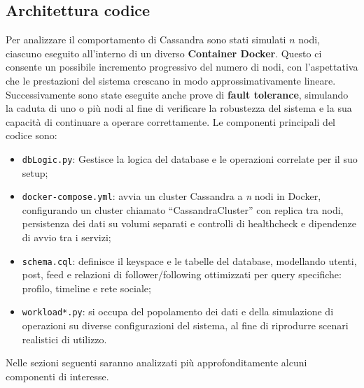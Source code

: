 \documentclass[12pt]{article}
\begin{document}
\subsection{Architettura codice} \label{s_architettura}
Per analizzare il comportamento di Cassandra sono stati simulati $n$ nodi, ciascuno eseguito all'interno di un diverso \textbf{Container Docker}. Questo ci consente un possibile incremento progressivo del numero di nodi, con l'aspettativa che le prestazioni del sistema crescano in modo approssimativamente lineare.
\newline\newline
Successivamente sono state eseguite anche prove di \textbf{fault tolerance}, simulando la caduta di uno o più nodi al fine di verificare la robustezza del sistema e la sua capacità di continuare a operare correttamente.
\newline\newline
Le componenti principali del codice sono:
\begin{itemize}
    \item \texttt{dbLogic.py}: Gestisce la logica del database e le operazioni correlate per il suo setup;
    \item \texttt{docker-compose.yml}: avvia un cluster Cassandra a \textit{n} nodi in Docker, configurando un cluster chiamato “CassandraCluster” con replica tra nodi, persistenza dei dati su volumi separati e controlli di healthcheck e dipendenze di avvio tra i servizi;
    \item \texttt{schema.cql}: definisce il keyspace e le tabelle del database, modellando utenti, post, feed e relazioni di follower/following ottimizzati per query specifiche: profilo, timeline e rete sociale;
    \item \texttt{workload*.py}: si occupa del popolamento dei dati e della simulazione di operazioni su diverse configurazioni del sistema, al fine di riprodurre scenari realistici di utilizzo.
\end{itemize}

\noindent
Nelle sezioni seguenti saranno analizzati più approfonditamente alcuni componenti di interesse.
\end{document}
